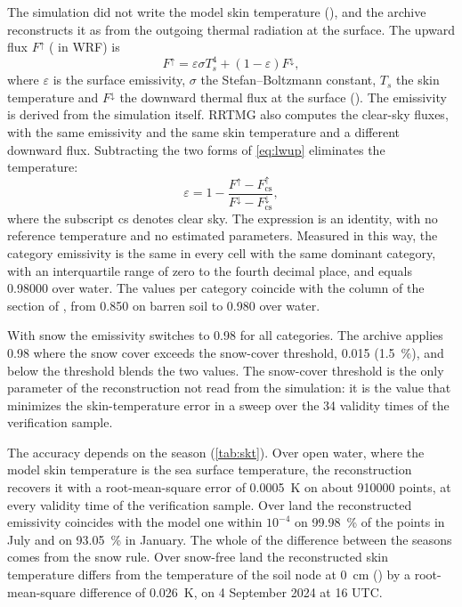 The simulation did not write the model skin temperature (), and the archive
reconstructs it as  from the outgoing thermal radiation at the surface. The upward flux
$F^{\uparrow}$ ( in WRF) is
\begin{equation}
  F^{\uparrow} = \varepsilon \sigma T_s^4 + (1 - \varepsilon) F^{\downarrow},
  \label{eq:lwup}
\end{equation}
where $\varepsilon$ is the surface emissivity, $\sigma$ the Stefan--Boltzmann constant, $T_s$ the
skin temperature and $F^{\downarrow}$ the downward thermal flux at the surface (). The
emissivity is derived from the simulation itself. RRTMG also computes the clear-sky fluxes, with
the same emissivity and the same skin temperature and a different downward flux. Subtracting the
two forms of \cref{eq:lwup} eliminates the temperature:
\begin{equation}
  \varepsilon = 1 - \frac{F^{\uparrow} - F^{\uparrow}_\text{cs}}{F^{\downarrow} - F^{\downarrow}_\text{cs}},
  \label{eq:emissivita}
\end{equation}
where the subscript cs denotes clear sky. The expression is an identity, with no reference
temperature and no estimated parameters. Measured in this way, the category emissivity is the same
in every cell with the same dominant category, with an interquartile range of zero to the fourth
decimal place, and equals \num{0.98000} over water. The values per category coincide with the
 column of the  section of  \parencite{wrf411}, from
\num{0.850} on barren soil to \num{0.980} over water.

With snow the emissivity switches to \num{0.98} for all categories. The archive applies \num{0.98}
where the snow cover  exceeds the snow-cover threshold, \num{0.015}
(\SI{1.5}{\percent}), and below the threshold blends the two values. The snow-cover threshold is
the only parameter of the reconstruction not read from the simulation: it is the value that minimizes
the skin-temperature error in a sweep over the 34 validity times of the verification sample.

The accuracy depends on the season (\cref{tab:skt}). Over open water, where the model skin
temperature is the sea surface temperature, the reconstruction recovers it with a root-mean-square error of
\SI{0.0005}{K} on about \num{910000} points, at every validity time of the verification sample.
Over land the reconstructed emissivity coincides with the model one within $10^{-4}$ on
\SI{99.98}{\percent} of the points in July and on \SI{93.05}{\percent} in January. The whole of the
difference between the seasons comes from the snow rule. Over snow-free land the reconstructed skin
temperature differs from the temperature of the soil node at \SI{0}{cm} () by a
root-mean-square difference of \SI{0.026}{K}, on 4 September 2024 at 16 UTC.

